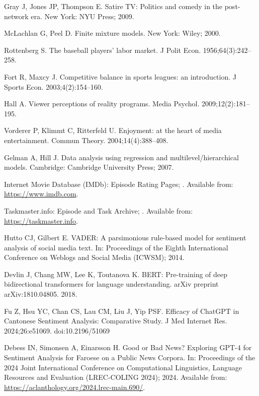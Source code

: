 \documentclass[10pt,letterpaper]{article}
\begin{document}
\begin{thebibliography}{22}

Gray J, Jones JP, Thompson E.
\newblock Satire TV: Politics and comedy in the post-network era.
\newblock New York: NYU Press; 2009.

McLachlan G, Peel D.
\newblock Finite mixture models.
\newblock New York: Wiley; 2000.

Rottenberg S.
\newblock The baseball players’ labor market.
\newblock J Polit Econ. 1956;64(3):242--258.

Fort R, Maxcy J.
\newblock Competitive balance in sports leagues: an introduction.
\newblock J Sports Econ. 2003;4(2):154--160.

Hall A.
\newblock Viewer perceptions of reality programs.
\newblock Media Psychol. 2009;12(2):181--195.

Vorderer P, Klimmt C, Ritterfeld U.
\newblock Enjoyment: at the heart of media entertainment.
\newblock Commun Theory. 2004;14(4):388--408.

Gelman A, Hill J.
\newblock Data analysis using regression and multilevel/hierarchical models.
\newblock Cambridge: Cambridge University Press; 2007.

Internet Movie Database (IMDb): Episode Rating Pages;
. Available from: \url{https://www.imdb.com}.

Taskmaster.info: Episode and Task Archive;
. Available from: \url{https://taskmaster.info}.

Hutto CJ, Gilbert E.
\newblock VADER: A parsimonious rule-based model for sentiment analysis of social media text.
\newblock In: Proceedings of the Eighth International Conference on Weblogs and Social Media (ICWSM); 2014.

Devlin J, Chang MW, Lee K, Toutanova K.
\newblock BERT: Pre-training of deep bidirectional transformers for language understanding.
\newblock arXiv preprint arXiv:1810.04805. 2018.

Fu Z, Hsu YC, Chan CS, Lau CM, Liu J, Yip PSF.
\newblock Efficacy of ChatGPT in Cantonese Sentiment Analysis: Comparative Study.
\newblock J Med Internet Res. 2024;26:e51069.
\newblock doi:10.2196/51069

Debess IN, Simonsen A, Einarsson H.
\newblock Good or Bad News? Exploring GPT-4 for Sentiment Analysis for Faroese on a Public News Corpora.
\newblock In: Proceedings of the 2024 Joint International Conference on Computational Linguistics, Language Resources and Evaluation (LREC-COLING 2024); 2024.
\newblock Available from: \url{https://aclanthology.org/2024.lrec-main.690/}.


\end{thebibliography}
\end{document}
